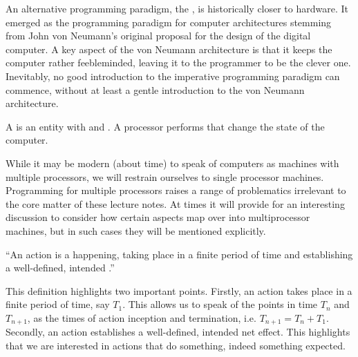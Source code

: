 An alternative programming paradigm, the , is historically
closer to hardware. It emerged as the programming paradigm for computer
architectures stemming from John von Neumann's original proposal for the design
of the digital computer\cite{von-neumann}.  A key aspect of the von Neumann
architecture is that it keeps the computer rather feebleminded, leaving it to
the programmer to be the clever one. Inevitably, no good introduction to the
imperative programming paradigm can commence, without at least a gentle
introduction to the von Neumann architecture.

\begin{definition}

A \footnotemark is an entity with  and
. A processor performs  that change the state of
the computer.


\end{definition}

While it may be modern (about time) to speak of computers as machines with
multiple processors, we will restrain ourselves to single processor machines.
Programming for multiple processors raises a range of problematics irrelevant
to the core matter of these lecture notes. At times it will provide for an
interesting discussion to consider how certain aspects map over into
multiprocessor machines, but in such cases they will be mentioned explicitly.

\begin{definition}

``An action is a happening, taking place in a finite period of time and
establishing a well-defined, intended .''
\cite{dijkstra-introduction}

\end{definition}

This definition highlights two important points. Firstly, an action takes place
in a finite period of time, say $T_1$. This allows us to speak of the points in
time $T_n$ and $T_{n+1}$, as the times of action inception and termination,
i.e. $T_{n+1}=T_n+T_1$. Secondly, an action establishes a well-defined,
intended net effect. This highlights that we are interested in actions that do
something, indeed something expected.

